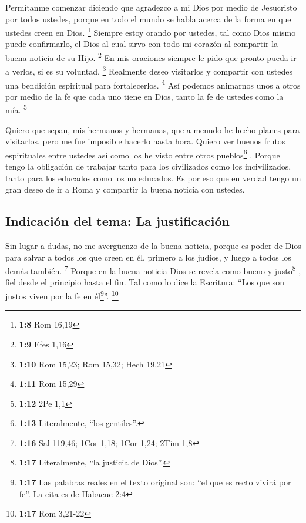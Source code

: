  Permítanme comenzar diciendo que agradezco a mi Dios por
medio de Jesucristo por todos ustedes, porque en todo el mundo se habla
acerca de la forma en que ustedes creen en Dios. \footnote{\textbf{1:8}
  Rom 16,19}  Siempre estoy orando por ustedes, tal como
Dios mismo puede confirmarlo, el Dios al cual sirvo con todo mi corazón
al compartir la buena noticia de su Hijo. \footnote{\textbf{1:9} Efes
  1,16}  En mis oraciones siempre le pido que pronto
pueda ir a verlos, si es su voluntad. \footnote{\textbf{1:10} Rom 15,23;
  Rom 15,32; Hech 19,21}  Realmente deseo visitarlos y
compartir con ustedes una bendición espiritual para fortalecerlos.
\footnote{\textbf{1:11} Rom 15,29}  Así podemos animarnos
unos a otros por medio de la fe que cada uno tiene en Dios, tanto la fe
de ustedes como la mía. \footnote{\textbf{1:12} 2Pe 1,1}

 Quiero que sepan, mis hermanos y hermanas, que a menudo
he hecho planes para visitarlos, pero me fue imposible hacerlo hasta
hora. Quiero ver buenos frutos espirituales entre ustedes así como los
he visto entre otros pueblos\footnote{\textbf{1:13} Literalmente, ``los
  gentiles''.} .  Porque tengo la obligación de trabajar
tanto para los civilizados como los incivilizados, tanto para los
educados como los no educados.  Es por eso que en verdad
tengo un gran deseo de ir a Roma y compartir la buena noticia con
ustedes.

\hypertarget{indicaciuxf3n-del-tema-la-justificaciuxf3n}{%
\subsection{Indicación del tema: La
justificación}\label{indicaciuxf3n-del-tema-la-justificaciuxf3n}}

 Sin lugar a dudas, no me avergüenzo de la buena noticia,
porque es poder de Dios para salvar a todos los que creen en él, primero
a los judíos, y luego a todos los demás también. \footnote{\textbf{1:16}
  Sal 119,46; 1Cor 1,18; 1Cor 1,24; 2Tim 1,8}  Porque en
la buena noticia Dios se revela como bueno y justo\footnote{\textbf{1:17}
  Literalmente, ``la justicia de Dios''.} , fiel desde el principio
hasta el fin. Tal como lo dice la Escritura: ``Los que son justos viven
por la fe en él\footnote{\textbf{1:17} Las palabras reales en el texto
  original son: ``el que es recto vivirá por fe''. La cita es de Habacuc
  2:4}''. \footnote{\textbf{1:17} Rom 3,21-22}

